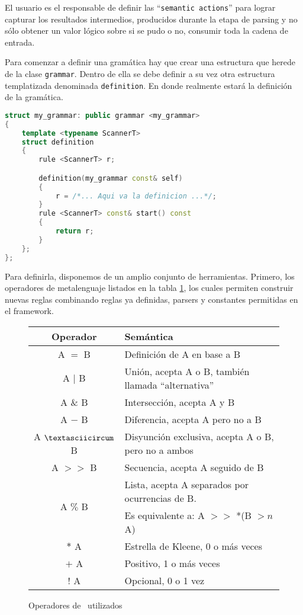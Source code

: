 El usuario es el responsable de definir las ``\texttt{semantic actions}'' para lograr capturar los resultados intermedios, producidos durante la etapa de parsing y no sólo obtener un valor lógico sobre si se pudo o no, consumir toda la cadena de entrada.

Para comenzar a definir una gramática hay que crear una estructura que herede de la clase \texttt{grammar}. Dentro de ella se debe definir a su vez otra estructura templatizada denominada \texttt{definition}. En donde realmente estará la definición de la gramática.


\begin{lstlisting}[float, language=C++, basicstyle=\scriptsize, columns=fullflexible, linewidth=8cm]
struct my_grammar: public grammar <my_grammar>
{
    template <typename ScannerT>
    struct definition
    {
        rule <ScannerT> r;

        definition(my_grammar const& self)
        {
            r = /*... Aqui va la definicion ...*/;
        }
        rule <ScannerT> const& start() const
        {
            return r;
        }
    };
};
\end{lstlisting}

Para definirla, disponemos de un amplio conjunto de herramientas. Primero, los operadores de metalenguaje listados en la tabla \ref{ope_spirit}, los cuales permiten construir nuevas reglas combinando reglas ya definidas, parsers y constantes permitidas en el framework.

\begin{figure}[h!]\centering\scriptsize
\begin{tabular}{| c | p{7cm} |}
\hline

\rowcolor{gris} \textbf{Operador} & \textbf{Semántica} \\ \hline

A $=$                  B  & Definición de A en base a B \\ \hline
A $|$                  B  & Unión, acepta A o B, también llamada ``alternativa''\\ \hline
A $\&$                 B  & Intersección, acepta A y B \\ \hline
A $-$                  B  & Diferencia, acepta A pero no a B  \\ \hline
A $\textasciicircum$   B  & Disyunción exclusiva, acepta A o B, pero no a ambos \\ \hline
A $>>$                 B  & Secuencia, acepta A seguido de B \\ \hline
\multirow{2}{*}{A $\%$ B} & Lista, acepta A separados por ocurrencias de B.\\
                          & Es equivalente a: A $>>$ *(B $>n$ A)\\ \hline
$*$                    A  & Estrella de Kleene, 0 o más veces \\ \hline
$+$                    A  & Positivo, 1 o más veces \\ \hline
$!$                    A  & Opcional, 0 o 1 vez \\ \hline
\end{tabular}
\caption{Operadores de \spirit\ utilizados}\label{ope_spirit}
\end{figure}

